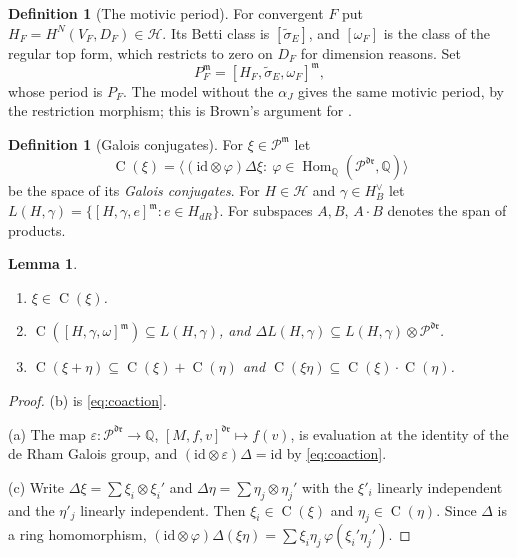 \documentclass[11pt]{article}
\theoremstyle{plain}
\newtheorem{lemma}[prop]{Lemma}
\theoremstyle{definition}
\newtheorem{defn}[prop]{Definition}
\theoremstyle{remark}
\newcommand{\Q}{\mathbb Q}
\newcommand{\m}{\mathfrak m}
\newcommand{\dr}{\mathfrak{dr}}
\newcommand{\Conj}{\operatorname{C}}
\newcommand{\tsig}{\widetilde\sigma}
\begin{document}
\begin{defn}[The motivic period]\label{def:mper}
For convergent $F$ put $H_F=H^N(V_F,D_F)\in\mathcal H$. Its Betti class is $[\tsig_E]$, and $[\omega_F]$ is the class of the regular top form, which restricts to zero on $D_F$ for dimension reasons. Set
\[
P_F^{\m}=[H_F,\tsig_E,\omega_F]^{\m},
\]
whose period is $P_F$. The model without the $\alpha_J$ gives the same motivic period, by the restriction morphism; this is Brown's argument for \cite[Cor.~8.9]{B2}.
\end{defn}

\begin{defn}[Galois conjugates]\label{def:conj}
For $\xi\in\mathcal P^{\m}$ let
\[
\Conj(\xi)=\big\langle(\mathrm{id}\otimes\varphi)\Delta\xi:\ \varphi\in\operatorname{Hom}_\Q(\mathcal P^{\dr},\Q)\big\rangle
\]
be the space of its \emph{Galois conjugates}. For $H\in\mathcal H$ and $\gamma\in H_B^\vee$ let $L(H,\gamma)=\{[H,\gamma,e]^{\m}:e\in H_{dR}\}$. For subspaces $A,B$, $A\cdot B$ denotes the span of products.
\end{defn}

\begin{lemma}\label{lem:conj}
\begin{enumerate}[label=(\alph*)]
\item $\xi\in\Conj(\xi)$.
\item $\Conj([H,\gamma,\omega]^{\m})\subseteq L(H,\gamma)$, and $\Delta L(H,\gamma)\subseteq L(H,\gamma)\otimes\mathcal P^{\dr}$.
\item $\Conj(\xi+\eta)\subseteq\Conj(\xi)+\Conj(\eta)$ and $\Conj(\xi\eta)\subseteq\Conj(\xi)\cdot\Conj(\eta)$.
\end{enumerate}
\end{lemma}

\begin{proof}
(b) is \eqref{eq:coaction}.

(a) The map $\varepsilon:\mathcal P^{\dr}\to\Q$, $[M,f,v]^{\dr}\mapsto f(v)$, is evaluation at the identity of the de Rham Galois group, and $(\mathrm{id}\otimes\varepsilon)\Delta=\mathrm{id}$ by \eqref{eq:coaction}.

(c) Write $\Delta\xi=\sum\xi_i\otimes\xi_i'$ and $\Delta\eta=\sum\eta_j\otimes\eta_j'$ with the $\xi'_i$ linearly independent and the $\eta'_j$ linearly independent. Then $\xi_i\in\Conj(\xi)$ and $\eta_j\in\Conj(\eta)$. Since $\Delta$ is a ring homomorphism, $(\mathrm{id}\otimes\varphi)\Delta(\xi\eta)=\sum\xi_i\eta_j\,\varphi(\xi_i'\eta_j')$.
\end{proof}
\end{document}
